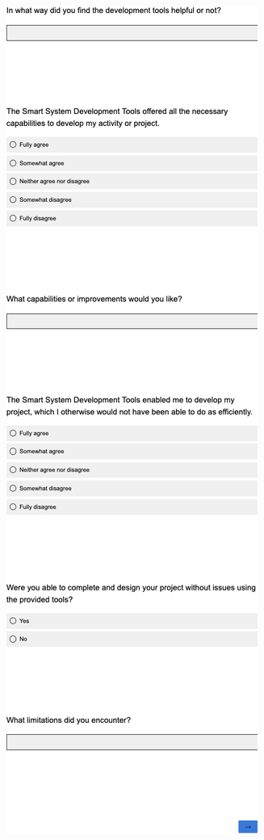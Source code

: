 \begin{multicols}{2}
\vfill
\includegraphics[width=.75\linewidth]{overleaf/images/q8.png}

\end{multicols}
